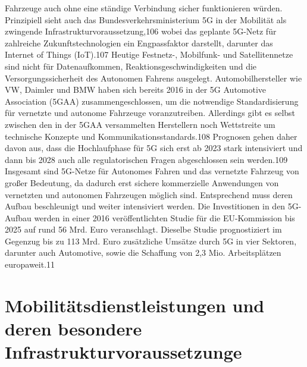 Fahrzeuge auch ohne eine ständige Verbindung sicher funktionieren würden.
Prinzipiell sieht auch das Bundesverkehrsministerium 5G in der Mobilität als
zwingende Infrastrukturvoraussetzung,106 wobei das geplante 5G-Netz für zahlreiche Zukunftstechnologien ein Engpassfaktor darstellt, darunter das Internet
of Things (IoT).107 Heutige Festnetz-, Mobilfunk- und Satellitennetze sind nicht
für Datenaufkommen, Reaktionsgeschwindigkeiten und die Versorgungssicherheit des Autonomen Fahrens ausgelegt. Automobilhersteller wie VW, Daimler und
BMW haben sich bereits 2016 in der 5G Automotive Association (5GAA) zusammengeschlossen, um die notwendige Standardisierung für vernetzte und autonome
Fahrzeuge voranzutreiben. Allerdings gibt es selbst zwischen den in der 5GAA versammelten Herstellern noch Wettstreite um technische Konzepte und Kommunikationsstandards.108 Prognosen gehen daher davon aus, dass die Hochlaufphase für
5G sich erst ab 2023 stark intensiviert und dann bis 2028 auch alle regulatorischen
Fragen abgeschlossen sein werden.109
Insgesamt sind 5G-Netze für Autonomes Fahren und das vernetzte Fahrzeug
von großer Bedeutung, da dadurch erst sichere kommerzielle Anwendungen von
vernetzten und autonomen Fahrzeugen möglich sind. Entsprechend muss deren
Aufbau beschleunigt und weiter intensiviert werden. Die Investitionen in den
5G-Aufbau werden in einer 2016 veröffentlichten Studie für die EU-Kommission
bis 2025 auf rund 56 Mrd. Euro veranschlagt. Dieselbe Studie prognostiziert
im Gegenzug bis zu 113 Mrd. Euro zusätzliche Umsätze durch 5G in vier Sektoren, darunter auch Automotive, sowie die Schaffung von 2,3 Mio. Arbeitsplätzen
europaweit.11



\chapter{Mobilitätsdienstleistungen und deren besondere Infrastrukturvoraussetzunge}
